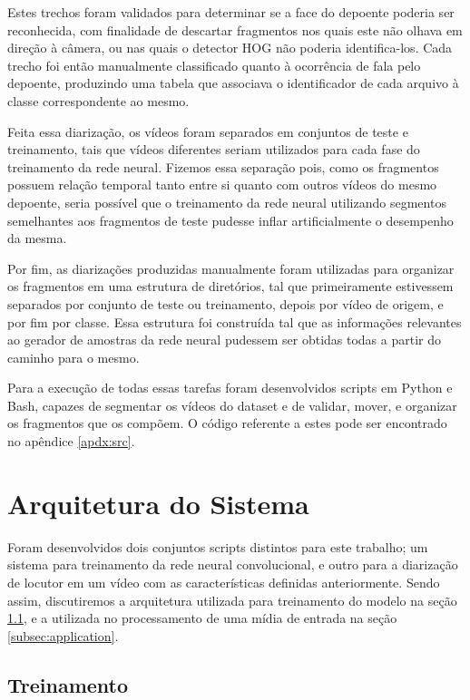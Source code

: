 Estes trechos foram validados para determinar se a face do depoente poderia ser reconhecida, com finalidade de descartar fragmentos nos quais este não olhava em direção à câmera, ou nas quais o detector HOG não poderia identifica-los. Cada trecho foi então manualmente classificado quanto à ocorrência de fala pelo depoente, produzindo uma tabela que associava o identificador de cada arquivo à classe correspondente ao mesmo.

Feita essa diarização, os vídeos foram separados em conjuntos de teste e treinamento, tais que vídeos diferentes seriam utilizados para cada fase do treinamento da rede neural. Fizemos essa separação pois, como os fragmentos possuem relação temporal tanto entre si quanto com outros vídeos do mesmo depoente, seria possível que o treinamento da rede neural utilizando segmentos semelhantes aos fragmentos de teste pudesse inflar artificialmente o desempenho da mesma.

Por fim, as diarizações produzidas manualmente foram utilizadas para organizar os fragmentos em uma estrutura de diretórios, tal que primeiramente estivessem separados por conjunto de teste ou treinamento, depois por vídeo de origem, e por fim por classe. Essa estrutura foi construída tal que as informações relevantes ao gerador de amostras da rede neural pudessem ser obtidas todas a partir do caminho para o mesmo.

Para a execução de todas essas tarefas foram desenvolvidos scripts em Python e Bash, capazes de segmentar os vídeos do dataset e de validar, mover, e organizar os fragmentos que os compõem. O código referente a estes pode ser encontrado no apêndice \ref{apdx:src}.

\section{Arquitetura do Sistema}
\label{sec:sysarch}

Foram desenvolvidos dois conjuntos scripts distintos para este trabalho; um sistema para treinamento da rede neural convolucional, e outro para a diarização de locutor em um vídeo com as características definidas anteriormente. Sendo assim, discutiremos a arquitetura utilizada para treinamento do modelo na seção \ref{subsec:train}, e a utilizada no processamento de uma mídia de entrada na seção \ref{subsec:application}.

\subsection{Treinamento}
\label{subsec:train}


